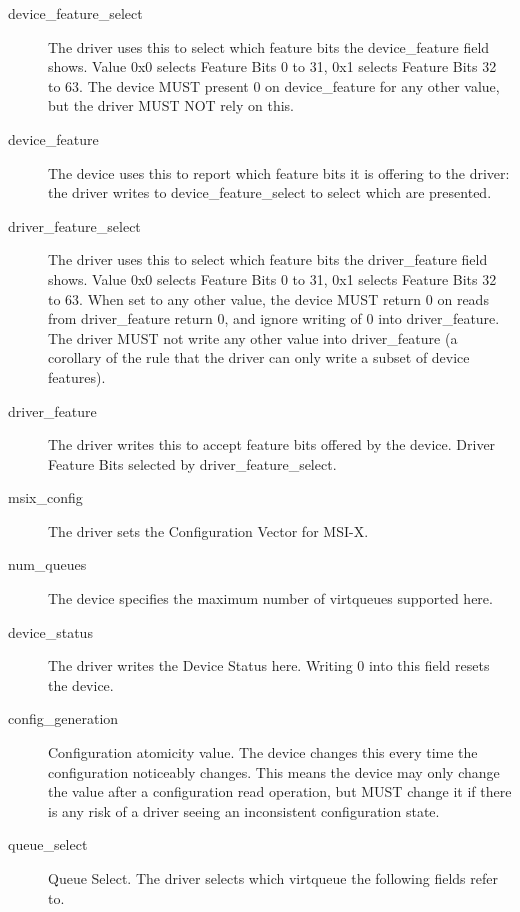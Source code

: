 \begin{description}
\item[device_feature_select]
        The driver uses this to select which feature bits the device_feature field shows.
        Value 0x0 selects Feature Bits 0 to 31, 0x1 selects Feature Bits 32 to 63.
        The device MUST present 0 on device_feature for any other value, but the driver MUST NOT rely on this.

\item[device_feature]
        The device uses this to report which feature bits it is
        offering to the driver: the driver writes to
        device_feature_select to select which are presented.

\item[driver_feature_select]
        The driver uses this to select which feature bits the driver_feature field shows.
        Value 0x0 selects Feature Bits 0 to 31, 0x1 selects Feature Bits 32 to 63.
        When set to any other value, the device MUST return 0 on reads from driver_feature
        return 0, and ignore writing of 0 into driver_feature.  The driver
        MUST not write any other value into driver_feature (a corollary of
        the rule that the driver can only write a subset of device features).

\item[driver_feature]
        The driver writes this to accept feature bits offered by the device.
        Driver Feature Bits selected by driver_feature_select.

\item[msix_config]
        The driver sets the Configuration Vector for MSI-X.

\item[num_queues]
        The device specifies the maximum number of virtqueues supported here.

\item[device_status]
        The driver writes the Device Status here. Writing 0 into this
        field resets the device.

\item[config_generation]
        Configuration atomicity value.  The device changes this every time the
        configuration noticeably changes.  This means the device may
        only change the value after a configuration read operation,
        but MUST change it if there is any risk of a driver seeing an
        inconsistent configuration state.

\item[queue_select]
        Queue Select. The driver selects which virtqueue the following
        fields refer to.


\end{description}

